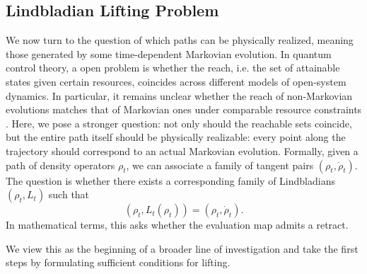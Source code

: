 \documentclass[11pt,reqno]{amsart}
\theoremstyle{definition}
\newcommand{\mc}{\mathcal}
\DeclareMathOperator{\ev}{ev}
\begin{document}
\subsection{Lindbladian Lifting Problem}
We now turn to the question of which paths can be physically realized, meaning those generated by some time-dependent Markovian evolution. In quantum control theory, a open problem is whether the reach, i.e. the set of attainable states given certain resources, coincides across different models of open-system dynamics. In particular, it remains unclear whether the reach of non-Markovian evolutions matches that of Markovian ones under comparable resource constraints \cite{koch2022}.
Here, we pose a stronger question: not only should the reachable sets coincide, but the entire path itself should be physically realizable: every point along the trajectory should correspond to an actual Markovian evolution.
Formally, given a path of density operators $\rho_t$, we can associate a family of tangent pairs $(\rho_t, \dot\rho_t)$. The question is whether there exists a corresponding family of Lindbladians $(\rho_t, L_t)$ such that
$$(\rho_t, L_t(\rho_t)) = (\rho_t, \dot\rho_t).$$
In mathematical terms, this asks whether the evaluation map admits a retract.
\begin{center}
\end{center}
We view this as the beginning of a broader line of investigation and take the first steps by formulating sufficient conditions for lifting.
\end{document}

